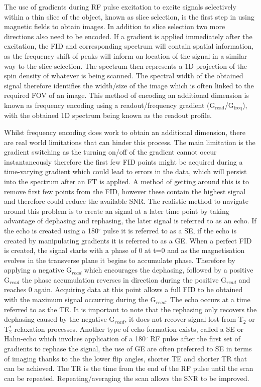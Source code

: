The use of gradients during \ac{RF} pulse excitation to excite signals selectively within a thin slice of the object, known as slice selection, is the first step in using magnetic fields to obtain images. In addition to slice selection two more directions also need to be encoded. If a gradient is applied immediately after the excitation, the \ac{FID} and corresponding spectrum will contain spatial information, as the frequency shift of peaks will inform on location of the signal in a similar way to the slice selection. The spectrum then represents a 1D projection of the spin density of whatever is being scanned. The spectral width of the obtained signal therefore identifies the width/size of the image which is often linked to the required \ac{FOV} of an image. This method of encoding an additional dimension is known as frequency encoding using a readout/frequency gradient (G$_{\textrm{read}}$/G$_{\textrm{freq}}$), with the obtained 1D spectrum being known as the readout profile.

Whilst frequency encoding does work to obtain an additional dimension, there are real world limitations that can hinder this process. The main limitation is the gradient switching as the turning on/off of the gradient cannot occur instantaneously therefore the first few \ac{FID} points might be acquired during a time-varying gradient which could lead to errors in the data, which will persist into the spectrum after an \ac{FT} is applied. A method of getting around this is to remove first few points from the \ac{FID}, however these contain the highest signal and therefore could reduce the available \ac{SNR}. The realistic method to navigate around this problem is to create an signal at a later time point by taking advantage of dephasing and rephasing, the later signal is referred to as an echo. If the echo is created using a 180$^\circ$ pulse it is referred to as a \ac{SE}, if the echo is created by manipulating gradients it is referred to as a \ac{GE}. When a perfect \ac{FID} is created, the signal starts with a phase of 0 at t=0 and as the magnetisation evolves in the transverse plane it begins to accumulate phase. Therefore by applying a negative G$_{read}$ which encourages the dephasing, followed by a positive G$_{read}$ the phase accumulation reverses in direction during the positive G$_{read}$ and reaches 0 again. Acquiring data at this point allows a full \ac{FID} to be obtained with the maximum signal occurring during the G$_{read}$. The echo occurs at a time referred to as the \ac{TE}. It is important to note that the rephasing only recovers the dephasing caused by the negative G$_{read}$, it does not recover signal lost from T$_2$ or T$_2^*$ relaxation processes. Another type of echo formation exists, called a \ac{SE} or Hahn-echo \cite{Hahn1950SpinEchoes} which involces application of a 180$^\circ$ \ac{RF} pulse after the first set of gradients to rephase the signal, the use of \ac{GE} are often preferred to SE in terms of imaging thanks to the the lower flip angles, shorter \ac{TE} and shorter \ac{TR} that can be achieved. The \ac{TR} is the time from the end of the \ac{RF} pulse until the scan can be repeated. Repeating/averaging the scan allows the \ac{SNR} to be improved.

